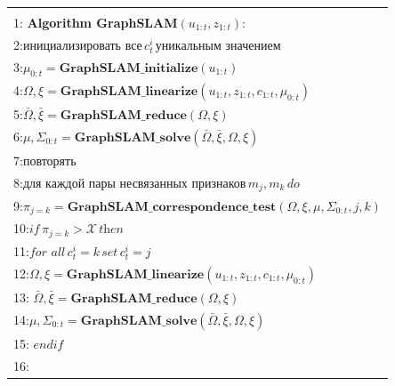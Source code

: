 \documentclass[10pt,a4paper]{article}
\begin{document}
\begin{table}[H]
\begin{center}
\begin{tabular}{|l|}
\hline
{}\\
1:\textbf{ Algorithm GraphSLAM}$(u_{1:t},z_{1:t}):$ \\
2:\hspace{5mm}$\textit{инициализировать все}\, c_t^i\,\textit{уникальным значением}$\\
3:\hspace{5mm}$\mu_{0:t}=\textbf{GraphSLAM\_initialize} (u_{1:t})$\\
4:\hspace{5mm}$\varOmega,\xi=\textbf{GraphSLAM\_linearize}(u_{1:t},z_{1:t},c_{1:t},\mu_{0:t})$\\
5:\hspace{5mm}$\bar{\varOmega},\bar{\xi}=\textbf{GraphSLAM\_reduce}(\varOmega,\xi)$\\
6:\hspace{5mm}$\mu,\varSigma_{0:t}=\textbf{GraphSLAM\_solve}(\bar{\varOmega},\bar{\xi},\varOmega,\xi)$\\
7:\hspace{5mm}$\textit{повторять}$\\
8:\hspace{10mm}$\textit{для каждой пары несвязанных признаков}\, m_j,m_k\, \textit{do}$\\
9:\hspace{15mm}$\pi_{j=k}=\textbf{GraphSLAM\_correspondence\_test}(\varOmega,\xi,\mu,\varSigma_{0:t},j,k)$\\
10:\hspace{14mm}$\textit{if}\,\pi_{j=k}>\mathcal{X}\,\textit{then}$\\
11:\hspace{18mm}$\textit{for all}\,c_t^i=k\,\textit{set}\,c_t^i=j$\\
12:\hspace{18mm}$\varOmega,\xi=\textbf{GraphSLAM\_linearize}(u_{1:t},z_{1:t},c_{1:t},\mu_{0:t})$\\
13:\hspace{18mm}
$\bar{\varOmega},\bar{\xi}=\textbf{GraphSLAM\_reduce}(\varOmega,\xi)$\\
14:\hspace{18mm}$\mu,\varSigma_{0:t}=\textbf{GraphSLAM\_solve}(\bar{\varOmega},\bar{\xi},\varOmega,\xi)$\\
15:\hspace{14mm}
$\textit{endif}$\\
16:\hspace{9mm}

\end{tabular}
\end{center}
\end{table}
\end{document}
